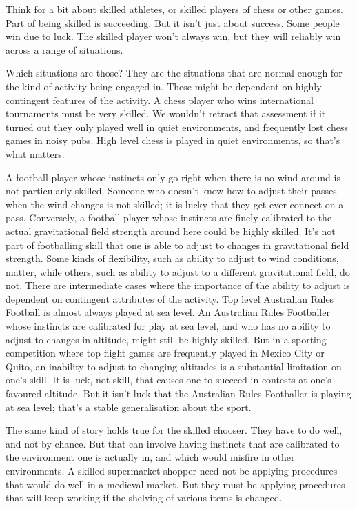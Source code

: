 \documentclass[
  10pt,
  letterpaper,
  DIV=11,
  numbers=noendperiod,
  twoside]{scrartcl}
\begin{document}
Think for a bit about skilled athletes, or skilled players of chess or
other games. Part of being skilled is succeeding. But it isn't just
about success. Some people win due to luck. The skilled player won't
always win, but they will reliably win across a range of situations.

Which situations are those? They are the situations that are normal
enough for the kind of activity being engaged in. These might be
dependent on highly contingent features of the activity. A chess player
who wins international tournaments must be very skilled. We wouldn't
retract that assessment if it turned out they only played well in quiet
environments, and frequently lost chess games in noisy pubs. High level
chess is played in quiet environments, so that's what matters.

A football player whose instincts only go right when there is no wind
around is not particularly skilled. Someone who doesn't know how to
adjust their passes when the wind changes is not skilled; it is lucky
that they get ever connect on a pass. Conversely, a football player
whose instincts are finely calibrated to the actual gravitational field
strength around here could be highly skilled. It's not part of
footballing skill that one is able to adjust to changes in gravitational
field strength. Some kinds of flexibility, such as ability to adjust to
wind conditions, matter, while others, such as ability to adjust to a
different gravitational field, do not. There are intermediate cases
where the importance of the ability to adjust is dependent on contingent
attributes of the activity. Top level Australian Rules Football is
almost always played at sea level. An Australian Rules Footballer whose
instincts are calibrated for play at sea level, and who has no ability
to adjust to changes in altitude, might still be highly skilled. But in
a sporting competition where top flight games are frequently played in
Mexico City or Quito, an inability to adjust to changing altitudes is a
substantial limitation on one's skill. It is luck, not skill, that
causes one to succeed in contests at one's favoured altitude. But it
isn't luck that the Australian Rules Footballer is playing at sea level;
that's a stable generalisation about the sport.

The same kind of story holds true for the skilled chooser. They have to
do well, and not by chance. But that can involve having instincts that
are calibrated to the environment one is actually in, and which would
misfire in other environments. A skilled supermarket shopper need not be
applying procedures that would do well in a medieval market. But they
must be applying procedures that will keep working if the shelving of
various items is changed.
\end{document}
